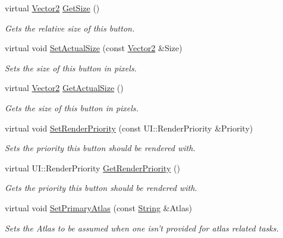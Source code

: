 \begin{DoxyCompactItemize}
virtual \hyperlink{classphys_1_1Vector2}{Vector2} \hyperlink{classphys_1_1UI_1_1Button_ade75e042d1a19be5d4fb1b16913af5a5}{GetSize} ()
\begin{DoxyCompactList}\small\item\em Gets the relative size of this button. \item\end{DoxyCompactList}\item 
virtual void \hyperlink{classphys_1_1UI_1_1Button_ab6c806b1bef7d1a3b9455914a1e9c8c0}{SetActualSize} (const \hyperlink{classphys_1_1Vector2}{Vector2} \&Size)
\begin{DoxyCompactList}\small\item\em Sets the size of this button in pixels. \item\end{DoxyCompactList}\item 
virtual \hyperlink{classphys_1_1Vector2}{Vector2} \hyperlink{classphys_1_1UI_1_1Button_ab6640af433afe96d5f6bd7016986d73f}{GetActualSize} ()
\begin{DoxyCompactList}\small\item\em Gets the size of this button in pixels. \item\end{DoxyCompactList}\item 
virtual void \hyperlink{classphys_1_1UI_1_1Button_ad3e723b07cfdc73db7276d0339d15f38}{SetRenderPriority} (const UI::RenderPriority \&Priority)
\begin{DoxyCompactList}\small\item\em Sets the priority this button should be rendered with. \item\end{DoxyCompactList}\item 
virtual UI::RenderPriority \hyperlink{classphys_1_1UI_1_1Button_aa17ffbc9b0d4eed151ff5ecbf93d88b8}{GetRenderPriority} ()
\begin{DoxyCompactList}\small\item\em Gets the priority this button should be rendered with. \item\end{DoxyCompactList}\item 
virtual void \hyperlink{classphys_1_1UI_1_1Button_a23bea9f25eabd941f859208e39735b5b}{SetPrimaryAtlas} (const \hyperlink{namespacephys_aa03900411993de7fbfec4789bc1d392e}{String} \&Atlas)
\begin{DoxyCompactList}\small\item\em Sets the Atlas to be assumed when one isn't provided for atlas related tasks. \item\end{DoxyCompactList}\item 

\end{DoxyCompactItemize}
